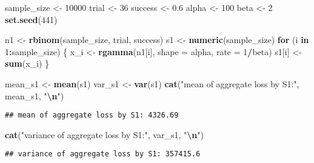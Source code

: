 \documentclass[
]{article}
\newenvironment{Shaded}{\begin{snugshade}}{\end{snugshade}}
\newcommand{\AttributeTok}[1]{\textcolor[rgb]{0.13,0.29,0.53}{#1}}
\newcommand{\ControlFlowTok}[1]{\textcolor[rgb]{0.13,0.29,0.53}{\textbf{#1}}}
\newcommand{\DecValTok}[1]{\textcolor[rgb]{0.00,0.00,0.81}{#1}}
\newcommand{\FloatTok}[1]{\textcolor[rgb]{0.00,0.00,0.81}{#1}}
\newcommand{\FunctionTok}[1]{\textcolor[rgb]{0.13,0.29,0.53}{\textbf{#1}}}
\newcommand{\NormalTok}[1]{#1}
\newcommand{\OtherTok}[1]{\textcolor[rgb]{0.56,0.35,0.01}{#1}}
\newcommand{\SpecialCharTok}[1]{\textcolor[rgb]{0.81,0.36,0.00}{\textbf{#1}}}
\newcommand{\StringTok}[1]{\textcolor[rgb]{0.31,0.60,0.02}{#1}}
\begin{document}
\begin{Shaded}
\begin{Highlighting}[]
\NormalTok{sample\_size }\OtherTok{\textless{}{-}} \DecValTok{10000}
\NormalTok{trial }\OtherTok{\textless{}{-}} \DecValTok{36}
\NormalTok{success }\OtherTok{\textless{}{-}} \FloatTok{0.6}
\NormalTok{alpha }\OtherTok{\textless{}{-}} \DecValTok{100}
\NormalTok{beta }\OtherTok{\textless{}{-}} \DecValTok{2}
\FunctionTok{set.seed}\NormalTok{(}\DecValTok{441}\NormalTok{)}

\NormalTok{n1 }\OtherTok{\textless{}{-}} \FunctionTok{rbinom}\NormalTok{(sample\_size, trial, success)}
\NormalTok{s1 }\OtherTok{\textless{}{-}} \FunctionTok{numeric}\NormalTok{(sample\_size)}
\ControlFlowTok{for}\NormalTok{ (i }\ControlFlowTok{in} \DecValTok{1}\SpecialCharTok{:}\NormalTok{sample\_size) \{}
\NormalTok{  x\_i }\OtherTok{\textless{}{-}} \FunctionTok{rgamma}\NormalTok{(n1[i], }\AttributeTok{shape =}\NormalTok{ alpha, }\AttributeTok{rate =} \DecValTok{1}\SpecialCharTok{/}\NormalTok{beta) }
\NormalTok{  s1[i] }\OtherTok{\textless{}{-}} \FunctionTok{sum}\NormalTok{(x\_i)}
\NormalTok{\}}

\NormalTok{mean\_s1 }\OtherTok{\textless{}{-}} \FunctionTok{mean}\NormalTok{(s1)}
\NormalTok{var\_s1 }\OtherTok{\textless{}{-}} \FunctionTok{var}\NormalTok{(s1)}
\FunctionTok{cat}\NormalTok{(}\StringTok{"mean of aggregate loss by S1:"}\NormalTok{, mean\_s1, }\StringTok{"}\SpecialCharTok{\textbackslash{}n}\StringTok{"}\NormalTok{)}
\end{Highlighting}
\end{Shaded}

\begin{verbatim}
## mean of aggregate loss by S1: 4326.69
\end{verbatim}

\begin{Shaded}
\begin{Highlighting}[]
\FunctionTok{cat}\NormalTok{(}\StringTok{"variance of aggregate loss by S1:"}\NormalTok{, var\_s1, }\StringTok{"}\SpecialCharTok{\textbackslash{}n}\StringTok{"}\NormalTok{)}
\end{Highlighting}
\end{Shaded}

\begin{verbatim}
## variance of aggregate loss by S1: 357415.6
\end{verbatim}
\end{document}
